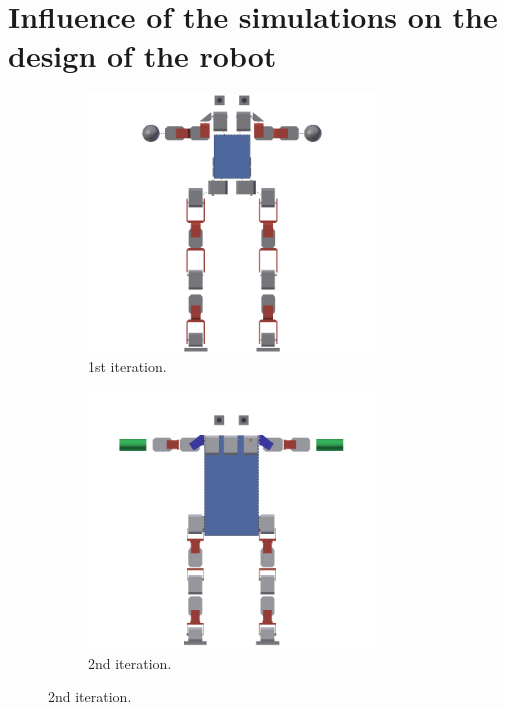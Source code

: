 \section{Influence of the simulations on the design of the robot}

\begin{figure}[htp]
	\centering
	\begin{subfigure}[b]{0.48\textwidth}
		\centering
		\includegraphics[width = 0.84\textwidth]{figures/robot_v2}
		\caption{1st iteration. \label{fig:robot_v2}}
	\end{subfigure}
	\hfill
	\begin{subfigure}[b]{0.48\textwidth}
		\centering
		\includegraphics[width = 0.84\textwidth]{figures/robot_v3}
		\caption{2nd iteration. \label{fig:robot_v3}}
	\end{subfigure}
	

\end{figure}
